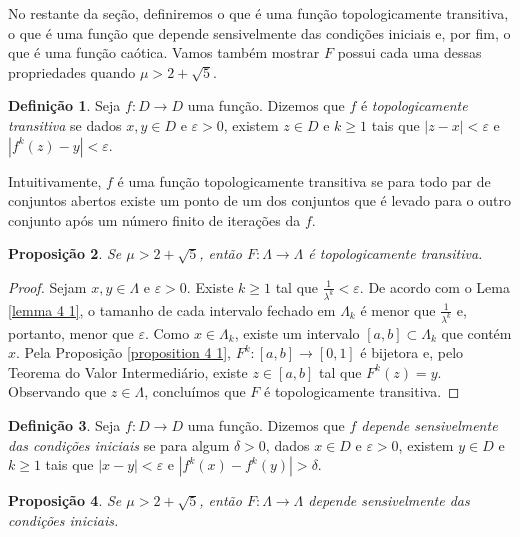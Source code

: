 \documentclass[a4paper, 12pt]{article}
\theoremstyle{definition}
\newtheorem{definition}{Definição}[section]
\theoremstyle{plain}
\newtheorem{proposition}[definition]{Proposição}
\theoremstyle{plain}
\theoremstyle{plain}
\theoremstyle{definition}
\theoremstyle{remark}
\begin{document}
No restante da seção, definiremos o que é uma função topologicamente transitiva, o que é uma função que depende sensivelmente das condições iniciais e, por fim, o que é uma função caótica. Vamos também mostrar $F$ possui cada uma dessas propriedades quando $\mu > 2 + \sqrt{5}$.

\begin{definition}
Seja $f: D \to D$ uma função. Dizemos que $f$ é \textit{topologicamente transitiva} se dados $x, y \in D$ e $\varepsilon > 0$,  existem $z \in D$ e $k \geq 1$ tais que $|z - x| < \varepsilon$ e $|f^k(z) - y| < \varepsilon$.
\end{definition} 

Intuitivamente, $f$ é uma função topologicamente transitiva se para todo par de conjuntos abertos existe um ponto de um dos conjuntos que é levado para o outro conjunto após um número finito de iterações da $f$.

\begin{proposition}
\label{proposition 4 3}
Se $\mu > 2 + \sqrt{5}$, então $F: \Lambda \to \Lambda$ é topologicamente transitiva.
\end{proposition}

\begin{proof}
Sejam $x, y \in \Lambda$ e $\varepsilon > 0$. Existe $k \geq 1$ tal que $\frac{1}{\lambda^k} < \varepsilon$. De acordo com o Lema \ref{lemma 4 1}, o tamanho de cada intervalo fechado em $\Lambda_k$ é menor que $\frac{1}{\lambda^k}$ e, portanto, menor que $\varepsilon$. Como $x \in \Lambda_ k$, existe um intervalo $[a, b] \subset \Lambda_ k$ que contém $x$. Pela Proposição \ref{proposition 4 1}, $F^k: [a, b] \to [0, 1]$ é bijetora e, pelo Teorema do Valor Intermediário, existe $z \in [a, b]$ tal que $F^k(z) = y$. Observando que $z \in \Lambda$, concluímos que $F$ é topologicamente transitiva.
\end{proof}

\begin{definition}
Seja $f: D \to D$ uma função. Dizemos que \textit{$f$ depende sensivelmente das condições iniciais} se para algum $\delta > 0$, dados $x \in D$ e $\varepsilon > 0$, existem $y \in D$ e $k \geq 1$ tais que $|x - y| < \varepsilon$ e $|f^k(x) - f^k(y)| > \delta$.
\end{definition}

\begin{proposition}
\label{proposition 4 4}
Se $\mu > 2 + \sqrt{5}$, então $F: \Lambda \to \Lambda$ depende sensivelmente das condições iniciais.
\end{proposition}
\end{document}
